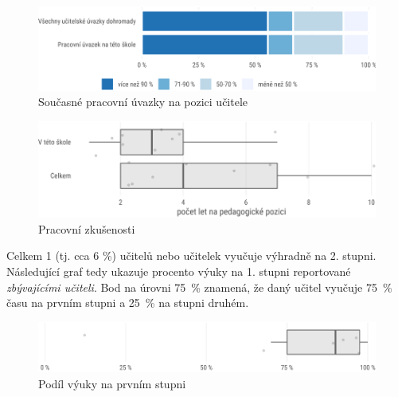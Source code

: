 \documentclass[12pt,a4paper,]{report}
\begin{document}
\begin{figure}

{\centering \includegraphics[width=\textwidth]{figs/job-1}

}

\caption{Současné pracovní úvazky na pozici učitele}\label{fig:job}
\end{figure}

\begin{figure}

{\centering \includegraphics[width=\textwidth]{figs/yearsTeach-1}

}

\caption{Pracovní zkušenosti}\label{fig:yearsTeach}
\end{figure}

Celkem 1 (tj. cca 6 \%) učitelů nebo učitelek vyučuje výhradně na 2. stupni. Následující graf tedy ukazuje procento výuky na 1. stupni reportované \emph{zbývajícími učiteli}. Bod na úrovni 75~\% znamená, že daný učitel vyučuje 75~\% času na prvním stupni a 25~\% na stupni druhém.

\begin{figure}

{\centering \includegraphics[width=\textwidth]{figs/s8q2-1}

}

\caption{Podíl výuky na prvním stupni}\label{fig:s8q2}
\end{figure}
\end{document}

